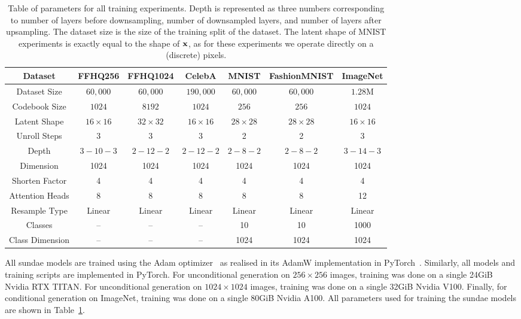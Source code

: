\begin{table}[ht]
    \centering
    \begin{tabular}{|c||c c||c||c c||c||}
    \hline
    \textbf{Dataset} & \textbf{FFHQ256} & \textbf{FFHQ1024} & \textbf{CelebA}
                     & \textbf{MNIST} & \textbf{FashionMNIST} &
                     \textbf{ImageNet} \\
    \hline
    Dataset Size & $60,000$ & $60,000$ & $190,000$ & $60,000$ & $60,000$ & $1.28$M \\
    Codebook Size & $1024$ & $8192$ & $1024$ & $256$ & $256$ & $1024$ \\
    Latent Shape & $16 \times 16$ & $32 \times 32$ & $16 \times 16$ & $28 \times
                 28$ & $28 \times 28$ & $16 \times 16$ \\
    Unroll Steps & 3 & 3 & 3 & 2 & 2 & 3 \\
    \hline
    Depth & $3-10-3$ & $2-12-2$ & $2-12-2$ & $2-8-2$ & $2-8-2$ & $3-14-3$\\
    Dimension & 1024 & 1024 & 1024 & 1024 & 1024 & 1024 \\
    Shorten Factor & 4 & 4 & 4 & 4 & 4 & 4 \\
    Attention Heads & 8 & 8 & 8 & 8 & 8 & 12 \\
    Resample Type & Linear & Linear & Linear & Linear & Linear & Linear \\
    \hline
    Classes & -- & -- & -- & 10 & 10 & 1000 \\
    Class Dimension & -- & -- & -- & 1024 & 1024 & 1024 \\
    \hline
    \end{tabular}
    \caption{
        Table of parameters for all training experiments. Depth is
        represented as three numbers corresponding to number of layers before
        downsampling, number of downsampled layers, and number of layers after
        upsampling. The dataset size is the size of the training split of the
        dataset. The latent shape of MNIST experiments is exactly equal to the
        shape of $\mathbf{x}$, as for these experiments we operate directly on a
        (discrete) pixels.
    }
    \label{tab:parameters}
\end{table}

All \gls{sundae} models are trained using the Adam
optimizer~\cite{kingma2014adam} as realised in its AdamW implementation in
PyTorch~\cite{paszke2019pytorch}. Similarly, all models and training scripts are
implemented in PyTorch. For unconditional generation on $256 \times 256$ images,
training was done on a single 24GiB Nvidia RTX TITAN. For unconditional
generation on $1024 \times 1024$ images, training was done on a single 32GiB
Nvidia V100. Finally, for conditional generation on ImageNet, training was done
on a single 80GiB Nvidia A100. All parameters used for training the
\gls{sundae} models are shown in Table~\ref{tab:parameters}.

